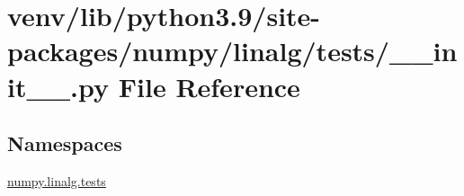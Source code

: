 \hypertarget{venv_2lib_2python3_89_2site-packages_2numpy_2linalg_2tests_2____init_____8py}{}\section{venv/lib/python3.9/site-\/packages/numpy/linalg/tests/\+\_\+\+\_\+init\+\_\+\+\_\+.py File Reference}
\label{venv_2lib_2python3_89_2site-packages_2numpy_2linalg_2tests_2____init_____8py}
\subsection*{Namespaces}
\begin{DoxyCompactItemize}
\item 
 \hyperlink{namespacenumpy_1_1linalg_1_1tests}{numpy.\+linalg.\+tests}
\end{DoxyCompactItemize}

